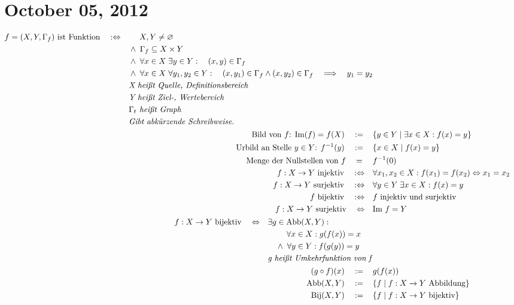 \documentclass{scrartcl}
\newcommand{\gdw}{\quad :\Leftrightarrow\quad &}
\newcommand{\is}{\quad :=\,\quad &}
\newcommand{\gleich}{\quad =\;\quad &}
\newcommand{\aeq}{\quad \Leftrightarrow\quad &} %
\newcommand{\sse}{\subseteq}
\newcommand{\s}[1]{\begin{split}#1\end{split}}
\begin{document}
\section{October 05, 2012}
\begin{align*}
  \s{f = (X, Y, \Gamma_f) \text{ ist Funktion} \gdw
    \quad\,\, X, Y \neq \varnothing \\
  & \land\; \Gamma_f \sse X \times Y \\
  & \land\; \forall x \in X\; \exists y \in Y: \quad (x, y) \in \Gamma_f \\
  & \land\; \forall x \in X\; \forall y_1, y_2 \in Y: \quad (x, y_1) \in \Gamma_f
    \land (x, y_2) \in \Gamma_f \quad \Longrightarrow \quad y_1 = y_2 \\
  & \text{\emph{X heißt Quelle, Definitionsbereich}} \\
  & \text{\emph{Y heißt Ziel-, Wertebereich}} \\
  & \text{\emph{$\Gamma_t$ heißt Graph}} \\
  & \text{\emph{Gibt abkürzende Schreibweise.}}
  } \\
  \text{Bild von $f$: } \text{Im}(f) = f(X) \is \{y \in Y \mid \exists x \in X:f(x)=y\} \\
  \text{Urbild an Stelle $y \in Y$: } f^{-1}(y) \is \{x \in X \mid f(x) = y\} \\
  \text{Menge der Nullstellen von }f \gleich f^{-1}(0) \\
  f : X \to Y \text{ injektiv} \gdw \forall x_1, x_2 \in X: f(x_1)=f(x_2)
    \Leftrightarrow x_1 = x_2 \\
  f : X \to Y \text{ surjektiv} \gdw \forall y \in Y\;\exists x \in X : f(x)=y \\
  f \text{ bijektiv} \gdw f \text{ injektiv und surjektiv} \\
  f : X \to Y \text{ surjektiv} \aeq \text{Im }f = Y \\
  \s{f : X \to Y \text{ bijektiv} \aeq \exists g \in \text{Abb}(X, Y): \\ 
    & \quad\quad\,\,\forall x \in X: g(f(x))=x \\
    & \quad\land \; \forall y \in Y: f(g(y))=y \\
    & \text{\emph{g heißt Umkehrfunktion von f}}} \\
  (g \circ f)(x) \is g(f(x)) \\
  \text{Abb}(X, Y) \is \{f \mid f:X \to Y \text{ Abbildung}\} \\
  \text{Bij}(X, Y) \is \{f \mid f:X \to Y \text{ bijektiv}\} \\

\end{align*}
\end{document}
